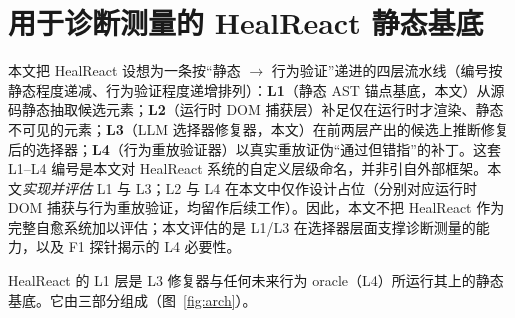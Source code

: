 \section{用于诊断测量的 HealReact 静态基底}
\label{sec:l1}

本文把 HealReact 设想为一条按“静态 $\to$ 行为验证”递进的四层流水线（编号按静态程度递减、行为验证程度递增排列）：\textbf{L1}（静态 AST 锚点基底，本文）从源码静态抽取候选元素；\textbf{L2}（运行时 DOM 捕获层）补足仅在运行时才渲染、静态不可见的元素；\textbf{L3}（LLM 选择器修复器，本文）在前两层产出的候选上推断修复后的选择器；\textbf{L4}（行为重放验证器）以真实重放证伪“通过但错指”的补丁。这套 L1--L4 编号是本文对 HealReact 系统的自定义层级命名，并非引自外部框架。本文\emph{实现并评估} L1 与 L3；L2 与 L4 在本文中仅作设计占位（分别对应运行时 DOM 捕获与行为重放验证，均留作后续工作）。因此，本文不把 HealReact 作为完整自愈系统加以评估；本文评估的是 L1/L3 在选择器层面支撑诊断测量的能力，以及 F1 探针揭示的 L4 必要性。

HealReact 的 L1 层是 L3 修复器与任何未来行为 oracle（L4）所运行其上的静态基底。它由三部分组成（图~\ref{fig:arch}）。


